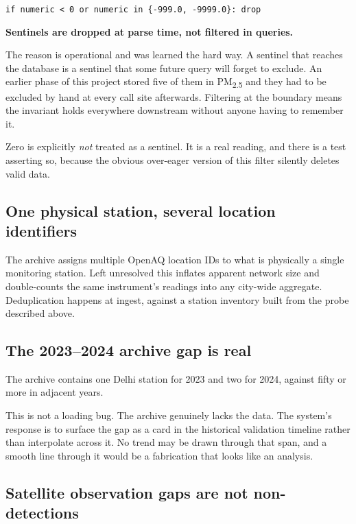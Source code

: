 \documentclass[11pt,a4paper]{article}
\newcommand{\keyclaim}[1]{%
  \par\vspace{0.7ex}\noindent
  \colorbox{vwash}{\parbox{\dimexpr\linewidth-2\fboxsep}{%
    \color{vblack}\textbf{#1}}}%
  \par\vspace{0.9ex}}
\newcommand{\code}[1]{\texttt{\small #1}}
\newcommand{\PM}{PM\textsubscript{2.5}}
\begin{document}
\begin{center}
\code{if numeric < 0 or numeric in \{-999.0, -9999.0\}: drop}
\end{center}

\keyclaim{Sentinels are dropped at parse time, not filtered in queries.}

The reason is operational and was learned the hard way. A sentinel that reaches the
database is a sentinel that some future query will forget to exclude. An earlier
phase of this project stored five of them in \PM{} and they had to be excluded by
hand at every call site afterwards. Filtering at the boundary means the invariant
holds everywhere downstream without anyone having to remember it.

Zero is explicitly \emph{not} treated as a sentinel. It is a real reading, and there
is a test asserting so, because the obvious over-eager version of this filter
silently deletes valid data.

\subsection{One physical station, several location identifiers}

The archive assigns multiple OpenAQ location IDs to what is physically a single
monitoring station. Left unresolved this inflates apparent network size and
double-counts the same instrument's readings into any city-wide aggregate.
Deduplication happens at ingest, against a station inventory built from the probe
described above.

\subsection{The 2023--2024 archive gap is real}

The archive contains one Delhi station for 2023 and two for 2024, against fifty or
more in adjacent years.

This is not a loading bug. The archive genuinely lacks the data. The system's
response is to surface the gap as a card in the historical validation timeline
rather than interpolate across it. No trend may be drawn through that span, and a
smooth line through it would be a fabrication that looks like an analysis.

\subsection{Satellite observation gaps are not non-detections}
\end{document}
